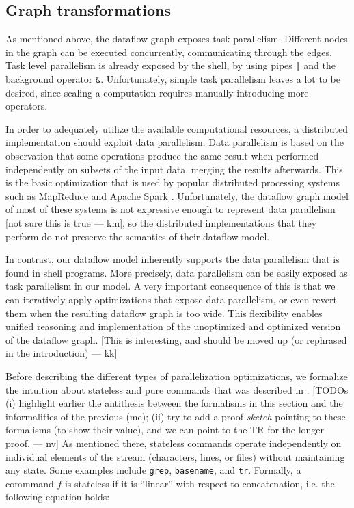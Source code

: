 \documentclass[sigplan,10pt,review,anonymous]{acmart}
\newcommand{\ttt}[1]{\texttt{\small #1}}
\newcommand{\nv}[1]{[{\color{cyan}#1 --- nv}]}
\newcommand{\kk}[1]{[{\color{magenta}#1 --- kk}]}
\newcommand{\km}[1]{[{\color{blue}#1 --- km}]}
\begin{document}
\subsection{Graph transformations}
\label{ir:transformations}

As mentioned above, the dataflow graph exposes task
parallelism. Different nodes in the graph can be executed
concurrently, communicating through the edges. Task level parallelism
is already exposed by the shell, by using pipes \ttt{|} and the
background operator \ttt{\&}. Unfortunately, simple task
parallelism leaves a lot to be desired, since scaling a computation
requires manually introducing more operators.

In order to adequately utilize the available computational resources,
a distributed implementation should exploit data parallelism. Data
parallelism is based on the observation that some operations produce
the same result when performed independently on subsets of the input
data, merging the results afterwards. This is the basic optimization
that is used by popular distributed processing systems such as
MapReduce \cite{DG2004MR} and Apache Spark \cite{spark:12}. Unfortunately, the
dataflow graph model of most of these systems is not expressive enough
to represent data parallelism \km{not sure this is true}, so the distributed implementations that
they perform do not preserve the semantics of their dataflow model.

In contrast, our dataflow model inherently supports the data
parallelism that is found in shell programs. More precisely, data
parallelism can be easily exposed as task parallelism in our model. A
very important consequence of this is that we can iteratively apply
optimizations that expose data parallelism, or even revert them when
the resulting dataflow graph is too wide. This flexibility enables
unified reasoning and implementation of the unoptimized and optimized
version of the dataflow graph. \kk{This is interesting, and should be
  moved up (or rephrased in the introduction)}

Before describing the different types of parallelization
optimizations, we formalize the intuition about stateless and pure
commands that was described in .
\nv{TODOs
  (i) highlight earlier the antithesis between the formalisms in this section and the informalities of the previous (me);
  (ii) try to add a proof \emph{sketch} pointing to these formalisms (to show their value), and we can point to the TR for the longer proof.
}
%
As mentioned there, stateless commands operate independently on
individual elements of the stream (characters, lines, or files)
without maintaining any state. Some examples include \ttt{grep},
\ttt{basename}, and \ttt{tr}. Formally, a commmand $f$ is stateless if
it is ``linear'' with respect to concatenation, i.e. the following
equation holds:
\end{document}
